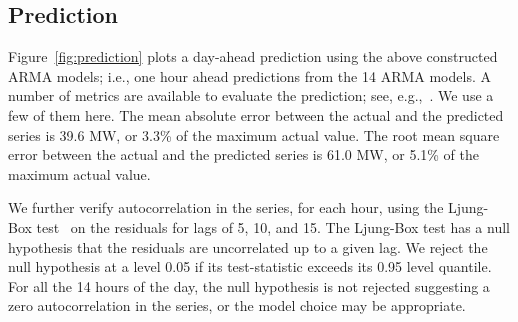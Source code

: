 \documentclass[review]{elsarticle}
\begin{document}
\begin{table}[!htb]
\centering
\caption{Estimated $p$ and $q$ values for ARMA($p,q$) models for 14 hours of 
the day}
\label{tab:order}
\end{table}

\subsection{Prediction}

Figure~\ref{fig:prediction} plots a day-ahead prediction using the above 
constructed ARMA models; i.e., one hour ahead predictions from the 14 ARMA 
models. A number of metrics are available to evaluate the prediction; see, 
e.g.,~\cite{coimbra2013overview}. We use a few of them here. The mean absolute 
error between the actual 
and the predicted series is 
39.6 MW, or  3.3\% of the maximum actual value. The root mean square 
error between the actual and the predicted series is 
61.0 MW, or  5.1\% of the maximum actual value. 

We further verify autocorrelation in the series, for each hour, using the 
Ljung-Box test~\cite{ljung1978measure} on the residuals for lags of 5, 10, 
and 15. The Ljung-Box  test has a 
null hypothesis that the residuals are uncorrelated up to a 
given lag. We reject the null hypothesis at a level 0.05 if its test-statistic 
exceeds its 
0.95 level quantile. For all the 14 hours of the day, the null hypothesis is not
rejected suggesting a zero autocorrelation in the series, or the 
model choice may be appropriate. 
\end{document}
